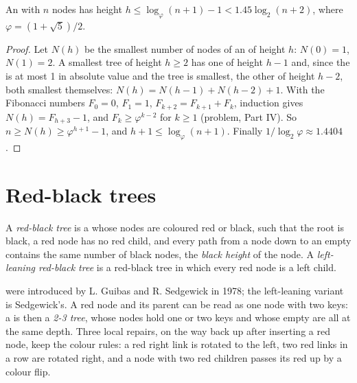 \begin{theorem}\label{thm:b1:balanced-trees:avl-height}
An  with $n$ nodes has height $h \leq \log_\varphi (n + 1) - 1 < 1.45 \log_2 (n + 2)$, where $\varphi = (1 +
\sqrt 5)/2$.
\end{theorem}

\begin{proof}
Let $N(h)$ be the smallest number of nodes of an  of height $h$: $N(0) = 1$, $N(1) = 2$. A smallest tree of height
$h \geq 2$ has one  of height $h - 1$ and, since the  is at most 1 in absolute value and the tree
is smallest, the other of height $h - 2$, both smallest themselves: $N(h) = N(h - 1) + N(h - 2) + 1$. With the Fibonacci
numbers $F_0 = 0$, $F_1 = 1$, $F_{k+2} = F_{k+1} + F_k$, induction gives $N(h) = F_{h+3} - 1$, and $F_k \geq
\varphi^{k-2}$ for $k \geq 1$ (problem, Part IV). So $n \geq N(h) \geq \varphi^{h+1} - 1$, and $h + 1 \leq \log_\varphi
(n + 1)$. Finally $1/\log_2 \varphi \approx 1.4404$.
\end{proof}

\label{out:b1:balanced-trees:minimal}

\section{Red-black trees}\label{sec:b1:balanced-trees:rb}

\begin{definition}\label{def:b1:balanced-trees:rb}
A \emph{red-black tree} is a  whose nodes are coloured red or black, such that
the root is black, a red node has no red child, and every path from a node down to an empty  contains the same
number of black nodes, the \emph{black height} of the node. A \emph{left-leaning red-black
tree} is a red-black tree in which every red node is a left child.
\end{definition}

 were introduced by L. Guibas and R. Sedgewick in 1978; the left-leaning variant is
Sedgewick's. A red node and its parent can be read as one node with two keys: a  is then a
\emph{2-3 tree}, whose nodes hold one or two keys and whose empty  are all at the same depth. Three local repairs,
on the way back up after inserting a red node, keep the colour rules: a red right link is rotated to the left, two red
links in a row are rotated right, and a node with two red children passes its red up by a colour flip.


